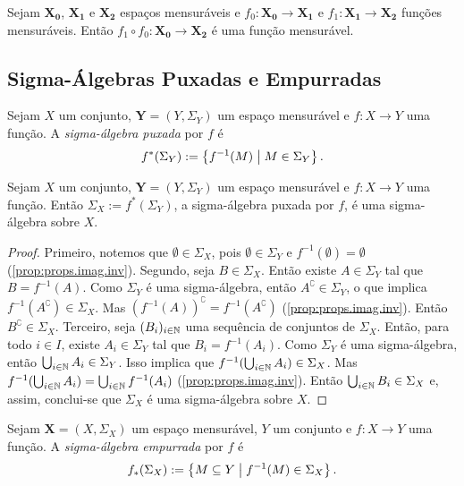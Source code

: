 \begin{prop}
Sejam $\bm{X_0}$, $\bm{X_1}$ e $\bm{X_2}$ espaços mensuráveis e $f_0: \bm{X_0} \to \bm{X_1}$ e $f_1: \bm{X_1} \to \bm{X_2}$ funções mensuráveis. Então $f_1 \circ f_0: \bm{X_0} \to \bm{X_2}$ é uma função mensurável.
\end{prop}

\subsection{Sigma-Álgebras Puxadas e Empurradas}

\begin{defi}
Sejam $X$ um conjunto, $\bm Y = (Y,\Sigma_Y)$ um espaço mensurável e $f: X \to Y$ uma função. A \emph{sigma-álgebra puxada} por $f$ é
	\begin{equation*}
	f^*(\Sigma_Y) := \left\{f^{-1}(M) \;\middle\vert\; M \in \Sigma_Y \right\}.
	\end{equation*}
\end{defi}

\begin{prop}
Sejam $X$ um conjunto, $\bm Y = (Y,\Sigma_Y)$ um espaço mensurável e $f: X \to Y$ uma função. Então $\Sigma_X := f^*(\Sigma_Y)$, a sigma-álgebra puxada por $f$, é uma sigma-álgebra sobre $X$.
\end{prop}
\begin{proof}
Primeiro, notemos que $\emptyset \in \Sigma_X$, pois $\emptyset \in \Sigma_Y$ e $f^{-1}(\emptyset) = \emptyset$ (\ref{prop:props.imag.inv}). Segundo, seja $B \in \Sigma_X$. Então existe $A \in \Sigma_Y$ tal que $B = f^{-1}(A)$. Como $\Sigma_Y$ é uma sigma-álgebra, então $A^\complement \in \Sigma_Y$, o que implica $f^{-1}(A^\complement) \in \Sigma_X$. Mas $(f^{-1}(A))^\complement = f^{-1}(A^\complement)$ (\ref{prop:props.imag.inv}). Então $B^\complement \in \Sigma_X$. Terceiro, seja $(B_i)_{i \in \mathbb{N}}$ uma sequência de conjuntos de $\Sigma_X$. Então, para todo $i \in I$, existe $A_i \in \Sigma_Y$ tal que $B_i = f^{-1}(A_i)$. Como $\Sigma_Y$ é uma sigma-álgebra, então $\bigcup_{i \in \mathbb{N}} A_i \in \Sigma_Y$. Isso implica que $f^{-1}(\bigcup_{i \in \mathbb{N}} A_i) \in \Sigma_X$. Mas $f^{-1}(\bigcup_{i \in \mathbb{N}} A_i) = \bigcup_{i \in \mathbb{N}} f^{-1}(A_i)$ (\ref{prop:props.imag.inv}). Então $\bigcup_{i \in \mathbb{N}} B_i \in \Sigma_X$ e, assim, conclui-se que $\Sigma_X$ é uma sigma-álgebra sobre $X$.
\end{proof}

\begin{defi}
Sejam $\bm X = (X,\Sigma_X)$ um espaço mensurável, $Y$ um conjunto e $f: X \to Y$ uma função. A \emph{sigma-álgebra empurrada} por $f$ é
	\begin{equation*}
	f_*(\Sigma_X) := \left\{M \subseteq Y \;\middle\vert\; f^{-1}(M) \in \Sigma_X \right\}.
	\end{equation*}
\end{defi}

